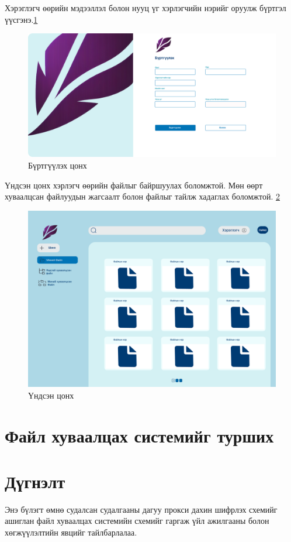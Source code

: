 \noindent Хэрэглэгч өөрийн мэдээллэл болон нууц үг хэрлэгчийн нэрийг оруулж бүртгэл үүсгэнэ.\ref{fig:register}
\begin{figure}[H]
    \centering
    \includegraphics[scale=0.25]{Figures/ui/register.png}
    \caption[Usecase diagram]{Бүртгүүлэх цонх}
    \label{fig:register}
\end{figure}

\noindent Үндсэн цонх хэрлэгч өөрийн файлыг байршуулах боломжтой. Мөн өөрт хуваалцсан файлуудын жагсаалт болон файлыг тайлж хадаглах боломжтой. \ref{fig:home}  
\begin{figure}[H]
    \centering
    \includegraphics[scale=0.25]{Figures/ui/home_with_files.png}
    \caption[Usecase diagram]{Үндсэн цонх}
    \label{fig:home}
\end{figure}

\section{Файл хуваалцах системийг турших}


\section{Дүгнэлт}
Энэ бүлэгт өмнө судалсан судалгааны дагуу прокси дахин шифрлэх схемийг ашиглан файл хуваалцах системийн схемийг гаргаж үйл ажилгааны болон хөгжүүлэлтийн явцийг тайлбарлалаа.